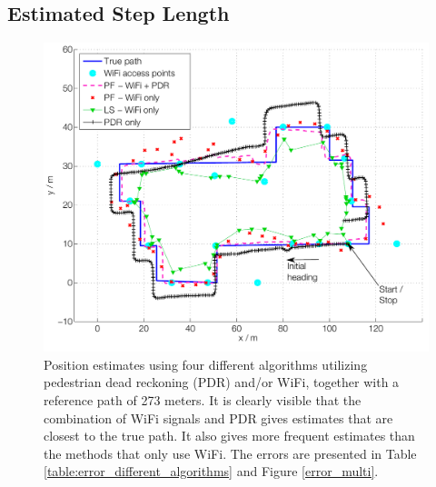 \documentclass{LTHthesis}
\begin{document}
\subsection{Estimated Step Length}
%
\begin{figure}[!hbt]

\includegraphics[width=1\textwidth ]{images/sensor_fused/path_multi}
\caption{Position estimates using four different algorithms utilizing pedestrian dead reckoning (PDR) and/or WiFi, together with a reference path of 273 meters. It is clearly visible that the combination of WiFi signals and PDR gives estimates that are closest to the true path. It also gives more frequent estimates than the methods that only use WiFi. The errors are presented in Table \ref{table:error_different_algorithms} and Figure \ref{error_multi}.}\label{path_multi}
\end{figure}
%
\end{document}

